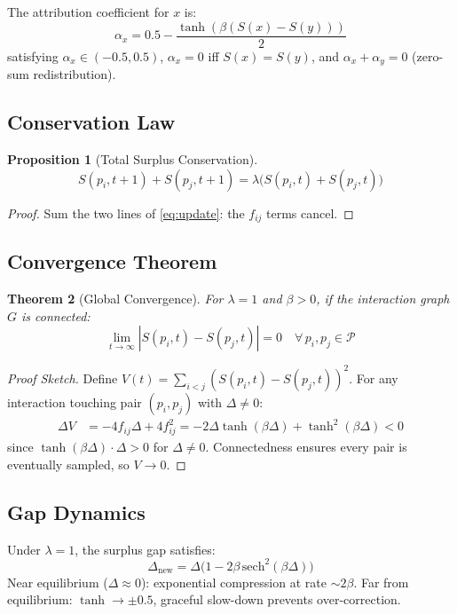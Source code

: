 \documentclass[12pt,letterpaper]{article}
\newtheorem{theorem}{Theorem}[section]
\newtheorem{proposition}[theorem]{Proposition}
\begin{document}
The attribution coefficient for $x$ is:
\begin{equation}
  \alpha_x = 0.5 - \frac{\tanh(\beta(S(x)-S(y)))}{2}
  \label{eq:alpha}
\end{equation}
satisfying $\alpha_x\in(-0.5,0.5)$, $\alpha_x=0$ iff $S(x)=S(y)$,
and $\alpha_x+\alpha_y=0$ (zero-sum redistribution).

\subsection{Conservation Law}
\begin{proposition}[Total Surplus Conservation]
\begin{equation}
  S(p_i,t+1)+S(p_j,t+1) = \lambda\bigl(S(p_i,t)+S(p_j,t)\bigr)
  \label{eq:conservation}
\end{equation}
\end{proposition}
\begin{proof}
Sum the two lines of \eqref{eq:update}: the $f_{ij}$ terms cancel.
\end{proof}

\subsection{Convergence Theorem}
\begin{theorem}[Global Convergence]\label{thm:convergence}
For $\lambda=1$ and $\beta>0$, if the interaction graph $G$ is connected:
\begin{equation}
  \lim_{t\to\infty}|S(p_i,t)-S(p_j,t)|=0 \quad\forall\,p_i,p_j\in\mathcal{P}
  \label{eq:convergence}
\end{equation}
\end{theorem}
\begin{proof}[Proof Sketch]
Define $V(t)=\sum_{i<j}(S(p_i,t)-S(p_j,t))^2$.
For any interaction touching pair $(p_i,p_j)$ with $\Delta\neq 0$:
\begin{align}
  \Delta V &= -4f_{ij}\Delta+4f_{ij}^2
  = -2\Delta\tanh(\beta\Delta)+\tanh^2(\beta\Delta) < 0
\end{align}
since $\tanh(\beta\Delta)\cdot\Delta>0$ for $\Delta\neq 0$.
Connectedness ensures every pair is eventually sampled, so $V\to 0$.
\end{proof}

\subsection{Gap Dynamics}
Under $\lambda=1$, the surplus gap satisfies:
\begin{equation}
  \Delta_{\mathrm{new}} = \Delta\bigl(1-2\beta\,\mathrm{sech}^2(\beta\Delta)\bigr)
  \label{eq:gap}
\end{equation}
Near equilibrium ($\Delta\approx 0$): exponential compression at rate $\sim 2\beta$.
Far from equilibrium: $\tanh\to\pm 0.5$, graceful slow-down prevents over-correction.
\end{document}
